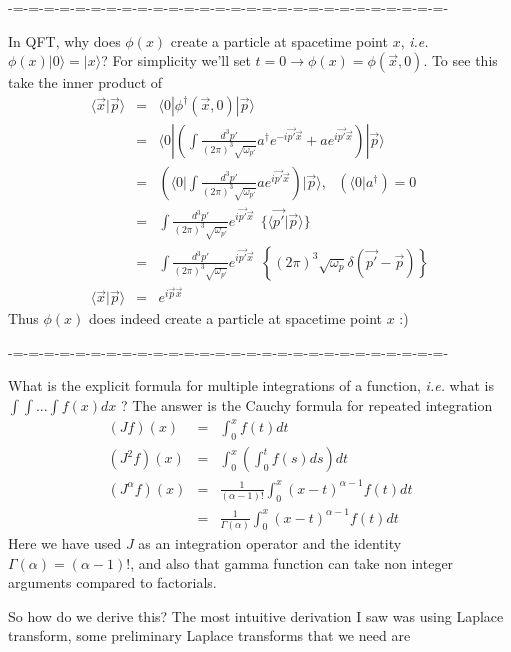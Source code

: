 \documentclass[aps,preprint,preprintnumbers,nofootinbib,showpacs,prd]{revtex4-1}
\newcommand{\ie}{{\it i.e.} }
\newcommand{\nbea}{\begin{eqnarray*}}
\newcommand{\neea}{\end{eqnarray*}}
\begin{document}
-=-=-=-=-=-=-=-=-=-=-=-=-=-=-=-=-=-=-=-=-=-=-=-=-=-=-=-=-

In QFT, why does $\phi(x)$ create a particle at spacetime point $x$, \ie $\phi(x)| 0 \rangle = |x \rangle$? For simplicity we'll set $t = 0 \rightarrow \phi(x) = \phi(\vec x, 0)$. To see this take the inner product of
\nbea
\langle \vec x | \vec p \rangle & = & \langle 0 |\phi^\dagger(\vec x, 0) | \vec p \rangle \\
& = & \langle 0 | \left ( \int \frac{d^3 p'}{(2 \pi)^3 \sqrt{\omega_{p'}}} a^\dagger e^{-i\vec {p'} \vec x} +  a e^{i\vec {p'} \vec x} \right ) | \vec p \rangle \\
& = & \left ( \langle 0 | \int \frac{d^3 p'}{(2 \pi)^3 \sqrt{\omega_{p'}}} a e^{i\vec {p'} \vec x} \right ) | \vec p \rangle, ~~~ ( \langle 0 | a^\dagger ) = 0 \\
& = & \int \frac{d^3 p'}{(2 \pi)^3 \sqrt{\omega_{p'}}} e^{i\vec {p'} \vec x} ~~ \{ \langle \vec {p'} | \vec p \rangle \} \\
& = & \int \frac{d^3 p'}{(2 \pi)^3 \sqrt{\omega_{p'}}} e^{i\vec {p'} \vec x} ~~ \left \{ (2 \pi)^3 \sqrt{\omega_{p}} \delta (\vec {p'} - \vec p) \right \} \\
\langle \vec x | \vec p \rangle & = & e^{i\vec {p} \vec x}
\neea
Thus $\phi(x)$ does indeed create a particle at spacetime point $x$ :)

-=-=-=-=-=-=-=-=-=-=-=-=-=-=-=-=-=-=-=-=-=-=-=-=-=-=-=-=-

What is the explicit formula for multiple integrations of a function, \ie what is $\int\int ... \int f(x) dx$ ? The answer is the Cauchy formula for repeated integration
\nbea
(J f)(x) & = & \int_0^x f(t) dt \\
(J^2 f)(x) & = & \int_0^x \left ( \int_0^t f(s) ds \right ) dt \\
(J^\alpha f)(x) & = & \frac{1}{(\alpha - 1)!}\int_0^x (x - t)^{\alpha-1} f(t) dt \\
& = & \frac{1}{\Gamma(\alpha)}\int_0^x (x - t)^{\alpha-1} f(t) dt
\neea
Here we have used $J$ as an integration operator and the identity $\Gamma(\alpha) = (\alpha-1)!$, and also that gamma function can take non integer arguments compared to factorials.

So how do we derive this? The most intuitive derivation I saw was using Laplace transform, some preliminary Laplace transforms that we need are
\end{document}
